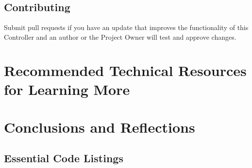 \documentclass[onecolumn, draftclsnofoot,10pt, compsoc]{report}
\begin{document}
\section{Contributing}

Submit pull requests if you have an update that improves the functionality of this Controller and an author or the Project Owner will test and approve changes.

\chapter{Recommended Technical Resources for Learning More}
\chapter{Conclusions and Reflections}
\appendix
\section{Essential Code Listings}
\end{document}
